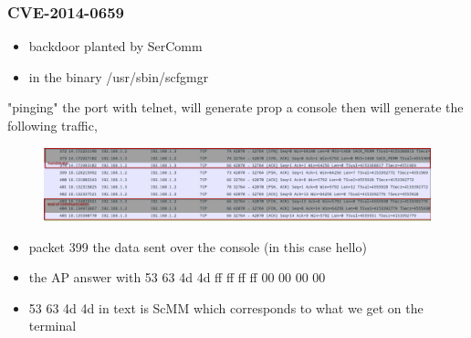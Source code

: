 \documentclass{beamer}
\begin{document}
\begin{frame}[fragile]
\begin{lstlisting}[basicstyle=\fontsize{0.5}{0.5}\selectfont\ttfamily, ]
	\end{lstlisting}
\end{frame}

\begin{frame}
	\frametitle{CVE-2014-0659}	

	\begin{itemize}
		\item backdoor planted by SerComm
		\item in the binary /usr/sbin/scfgmgr
	\end{itemize}

	"pinging" the port with telnet, will generate prop a console then will generate the following traffic,
	\begin{figure} 
		\includegraphics[width=\textwidth]{example.png}
	\end{figure}
	\begin{itemize}
		\item packet 399 the data sent over the console (in this case hello)
		\item the AP answer with 53 63 4d 4d ff ff ff ff 00 00 00 00
		\item 53 63 4d 4d in text is ScMM which corresponds to what we get on the terminal
	\end{itemize}
\end{frame}
\end{document}
